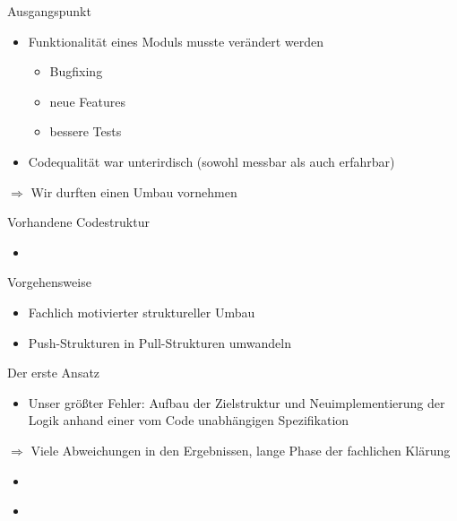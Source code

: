 \begin{frame}[t,fragile]{Ausgangspunkt}
\begin{itemize}
\item Funktionalität eines Moduls musste verändert werden
\begin{itemize}
\item Bugfixing
\item neue Features
\item bessere Tests
\end{itemize}
\item Codequalität war unterirdisch (sowohl messbar als auch erfahrbar)
\end{itemize}

$\Longrightarrow$ Wir durften einen Umbau vornehmen
\end{frame}

\begin{frame}[t,fragile]{Vorhandene Codestruktur}
\begin{itemize}
\item
\end{itemize}
\end{frame}



\begin{frame}[t,fragile]{Vorgehensweise}
\begin{itemize}
\item Fachlich motivierter struktureller Umbau
\item Push-Strukturen in Pull-Strukturen umwandeln
\end{itemize}
\end{frame}

\begin{frame}[t,fragile]{Der erste Ansatz}
\begin{itemize}
\item Unser größter Fehler: Aufbau der Zielstruktur und Neuimplementierung der Logik anhand einer vom Code unabhängigen Spezifikation
\end{itemize}
$\Longrightarrow$ Viele Abweichungen in den Ergebnissen, lange Phase der fachlichen Klärung
\end{frame}

\begin{frame}[t,fragile]{}
\begin{itemize}
\item
\end{itemize}
\end{frame}

\begin{frame}[t,fragile]{}
\begin{itemize}
\item
\end{itemize}
\end{frame}

